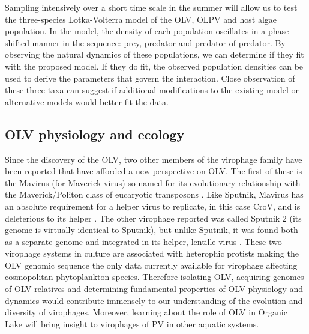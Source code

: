 Sampling intensively over a short time scale in the summer will allow us to test the three-species Lotka-Volterra model of the \ac{OLV}, \ac{OLPV} and host algae population.
In the model, the density of each population oscillates in a phase-shifted manner in the sequence: prey, predator and predator of predator.
By observing the natural dynamics of these populations, we can determine if they fit with the proposed model.
If they do fit, the observed population densities can be used to derive the parameters that govern the interaction.
Close observation of these three taxa can suggest if additional modifications to the existing model or alternative models would better fit the data.

\subsection{\acs{OLV} physiology and ecology}
Since the discovery of the \ac{OLV}, two other members of the virophage family have been reported that have afforded a new perspective on \ac{OLV}.
The first of these is the Mavirus (for Maverick virus) so named for its evolutionary relationship with the Maverick/Politon class of eucaryotic transposons \cite{Fischer2011a}.
Like Sputnik, Mavirus has an absolute requirement for a helper virus to replicate, in this case \ac{CroV}, and is deleterious to its helper \cite{Fischer2011a}.
The other virophage reported was called Sputnik 2 (its genome is virtually identical to Sputnik), but unlike Sputnik, it was found both as a separate genome and integrated in its helper, lentille virus \cite{Desnues2012}.
These two virophage systems in culture are associated with heterophic protists making the \ac{OLV} genomic sequence the only data currently available for virophage affecting cosmopolitan phytoplankton species.
Therefore isolating \ac{OLV}, acquiring genomes of \ac{OLV} relatives and determining fundamental properties of \ac{OLV} physiology and dynamics would contribute immensely to our understanding of the evolution and diversity of virophages.
Moreover, learning about the role of \ac{OLV} in Organic Lake will bring insight to virophages of \ac{PV} in other aquatic systems.

